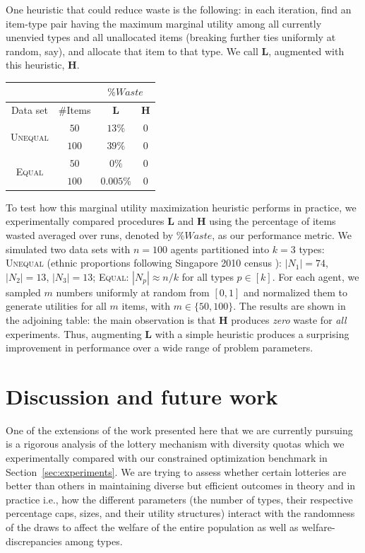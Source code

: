 \documentclass[11pt,dvipdfmx]{article}
\begin{document}
One heuristic that could reduce waste is the following: %
in each iteration, find an item-type pair having the maximum marginal utility among all currently unenvied types and all unallocated items (breaking further ties uniformly at random, say), and allocate that item to that type. We call {\bf L}, augmented with this heuristic, {\bf H}. 
\begin{table}
	\begin{tabular}{|c|c||c|c|}
		\cline{3-4}
		\multicolumn{2}{c}{}  & \multicolumn{2}{|c|}{$\%Waste$}\\ \hline 
		Data set & $\#$Items & {\bf L} & {\bf H}\\ \hline 
		\multirow{2}{*}{\textsc{Unequal}} & $50$ & $13\%$ & $0$ \\ \cline{2-4}
		& $100$ & $39\%$ & $0$ \\ \hline
		\multirow{2}{*}{\textsc{Equal}}  & $50$ & $0\%$ & $0$ \\ \cline{2-4}
		& $100$ & $0.005\%$ & $0$ \\ \hline
	\end{tabular}
\end{table}
To test how this marginal utility maximization heuristic performs in practice, we experimentally compared procedures {\bf L} and {\bf H} using the percentage of items wasted averaged over runs, denoted by $\%Waste$, as our performance metric. We simulated two data sets with $n = 100$ agents partitioned into $k=3$ types: \textsc{Unequal} (ethnic proportions following Singapore 2010 census \cite{Sing2010}): $|N_1| = 74$, $|N_2| = 13$, $|N_3| = 13$; 
\textsc{Equal}: $|N_p| \approx n/k$ for all types $p \in [k]$. For each agent, we sampled $m$ numbers uniformly at random from $[0,1]$ and normalized them to generate utilities for all $m$ items, with $m \in \{50,100\}$. The results are shown in the adjoining table: the main observation is that {\bf H} produces \emph{zero} waste for \emph{all} experiments. Thus, augmenting {\bf L} with a simple heuristic produces a surprising improvement in performance over a wide range of problem parameters.   

\section{Discussion and future work}\label{sec:concl}
One of the extensions of the work presented here that we are currently pursuing is a rigorous analysis of the lottery mechanism with diversity quotas which we experimentally compared with our constrained optimization benchmark in Section~\ref{sec:experiments}. We are trying to assess whether certain lotteries are better than others in maintaining diverse but efficient outcomes in theory and in practice i.e., how the different parameters (the number of types, their respective percentage caps, sizes, and their utility structures) interact with the randomness of the draws to affect the welfare of the entire population as well as welfare-discrepancies among types. 
\end{document}
